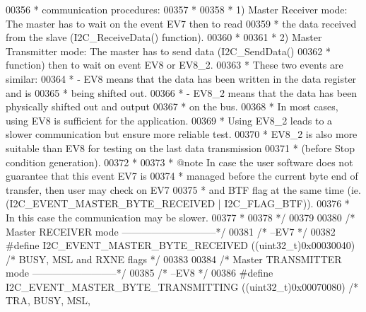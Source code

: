 \begin{DoxyCode}
00356 \textcolor{comment}{  * communication procedures:}
00357 \textcolor{comment}{  *  }
00358 \textcolor{comment}{  * 1) Master Receiver mode: The master has to wait on the event EV7 then to read }
00359 \textcolor{comment}{  *    the data received from the slave (I2C\_ReceiveData() function).}
00360 \textcolor{comment}{  * }
00361 \textcolor{comment}{  * 2) Master Transmitter mode: The master has to send data (I2C\_SendData() }
00362 \textcolor{comment}{  *    function) then to wait on event EV8 or EV8\_2.}
00363 \textcolor{comment}{  *    These two events are similar: }
00364 \textcolor{comment}{  *     - EV8 means that the data has been written in the data register and is }
00365 \textcolor{comment}{  *       being shifted out.}
00366 \textcolor{comment}{  *     - EV8\_2 means that the data has been physically shifted out and output }
00367 \textcolor{comment}{  *       on the bus.}
00368 \textcolor{comment}{  *     In most cases, using EV8 is sufficient for the application.}
00369 \textcolor{comment}{  *     Using EV8\_2 leads to a slower communication but ensure more reliable test.}
00370 \textcolor{comment}{  *     EV8\_2 is also more suitable than EV8 for testing on the last data transmission }
00371 \textcolor{comment}{  *     (before Stop condition generation).}
00372 \textcolor{comment}{  *     }
00373 \textcolor{comment}{  *  @note In case the  user software does not guarantee that this event EV7 is }
00374 \textcolor{comment}{  *        managed before the current byte end of transfer, then user may check on EV7 }
00375 \textcolor{comment}{  *        and BTF flag at the same time (ie. (I2C\_EVENT\_MASTER\_BYTE\_RECEIVED | I2C\_FLAG\_BTF)).}
00376 \textcolor{comment}{  *        In this case the communication may be slower.}
00377 \textcolor{comment}{  * }
00378 \textcolor{comment}{  */}
00379 
00380 \textcolor{comment}{/* Master RECEIVER mode -----------------------------*/}
00381 \textcolor{comment}{/* --EV7 */}
00382 \textcolor{preprocessor}{#}\textcolor{preprocessor}{define}  \textcolor{preprocessor}{I2C\_EVENT\_MASTER\_BYTE\_RECEIVED}                    \textcolor{preprocessor}{(}\textcolor{preprocessor}{(}\textcolor{preprocessor}{uint32\_t}\textcolor{preprocessor}{)}0x00030040\textcolor{preprocessor}{)}  \textcolor{comment}{/* BUSY, MSL and
       RXNE flags */}
00383 
00384 \textcolor{comment}{/* Master TRANSMITTER mode --------------------------*/}
00385 \textcolor{comment}{/* --EV8 */}
00386 \textcolor{preprocessor}{#}\textcolor{preprocessor}{define} \textcolor{preprocessor}{I2C\_EVENT\_MASTER\_BYTE\_TRANSMITTING}                 \textcolor{preprocessor}{(}\textcolor{preprocessor}{(}\textcolor{preprocessor}{uint32\_t}\textcolor{preprocessor}{)}0x00070080\textcolor{preprocessor}{)} \textcolor{comment}{/* TRA, BUSY, MSL,
}
\end{DoxyCode}
